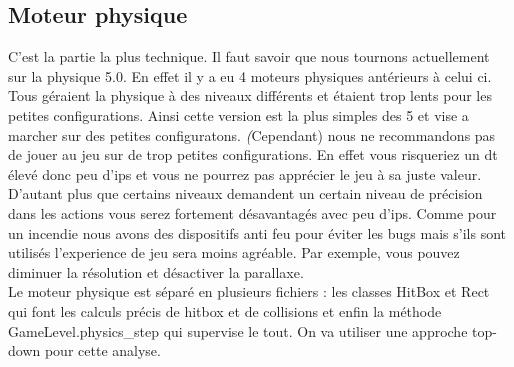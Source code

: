\documentclass[11pt]{article}
\begin{document}
\subsection{Moteur physique}
C'est la partie la plus technique. Il faut savoir que nous tournons actuellement sur la physique 5.0. En effet il y a eu 4 moteurs physiques antérieurs à celui ci. Tous géraient la physique à des niveaux différents et étaient trop lents pour les petites configurations. Ainsi cette version est la plus simples des 5 et vise a marcher sur des petites configuratons. \emph(Cependant) nous ne recommandons pas de jouer au jeu sur de trop petites configurations. En effet vous risqueriez un dt élevé donc peu d'ips et vous ne pourrez pas apprécier le jeu à sa juste valeur. D'autant plus que certains niveaux demandent un certain niveau de précision dans les actions vous serez fortement désavantagés avec peu d'ips. Comme pour un incendie nous avons des dispositifs anti feu pour éviter les bugs mais s'ils sont utilisés l'experience de jeu sera moins agréable. Par exemple, vous pouvez diminuer la résolution et désactiver la parallaxe.\\
\indent Le moteur physique est séparé en plusieurs fichiers : les classes HitBox et Rect qui font les calculs précis de hitbox et de collisions et enfin la méthode GameLevel.physics\_step qui supervise le tout. On va utiliser une approche top-down pour cette analyse.\\
\end{document}
